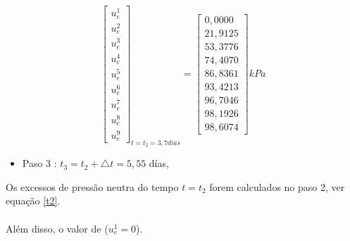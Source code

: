 \documentclass{article} %
\begin{document}
\begin{equation}\label{t2}
\begin{bmatrix}
u_e^1\\
u_e^2\\
u_e^3\\
u_e^4\\
u_e^5\\
u_e^6\\
u_e^7\\
u_e^8\\
u_e^9
\end{bmatrix}_{t=t_2=3,7dias}=\begin{bmatrix}
0,0000\\
21,9125\\
53,3776\\
74,4070\\
86,8361\\
93,4213\\
96,7046\\
98,1926\\
98,6074
\end{bmatrix}kPa
\end{equation}


\begin{itemize}
	\item Paso 3 : \(t_3=t_2+\triangle t=5,55\) días,
\end{itemize}

Os excessos de pressão neutra do tempo \(t=t_2\) forem calculados no paso 2, ver equação \ref{t2}.\\
\\
\indent Além disso, o valor de (\(u_e^1=0\)).\\
\end{document}
